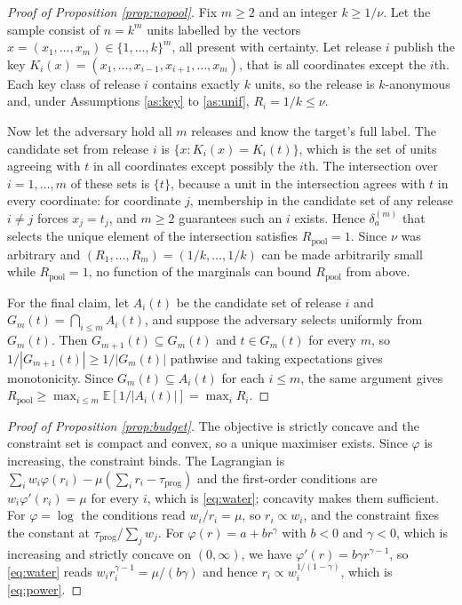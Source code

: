 \documentclass[11pt,a4paper]{article}
\theoremstyle{plain}
\theoremstyle{definition}
\theoremstyle{definition}
\theoremstyle{plain}
\newcommand{\E}{\mathbb{E}}
\begin{document}
\begin{proof}[Proof of Proposition \ref{prop:nopool}]
Fix $m \geq 2$ and an integer $k \geq 1/\nu$. Let the sample consist of
$n = k^m$ units labelled by the vectors $x = (x_1, \dots, x_m) \in \{1, \dots,
k\}^m$, all present with certainty. Let release $i$ publish the key
$K_i(x) = (x_1, \dots, x_{i-1}, x_{i+1}, \dots, x_m)$, that is all coordinates
except the $i$th. Each key class of release $i$ contains exactly $k$ units, so
the release is $k$-anonymous and, under Assumptions \ref{as:key} to
\ref{as:unif}, $R_i = 1/k \leq \nu$.

Now let the adversary hold all $m$ releases and know the target's full label.
The candidate set from release $i$ is $\{x : K_i(x) = K_i(t)\}$, which is the
set of units agreeing with $t$ in all coordinates except possibly the $i$th.
The intersection over $i = 1, \dots, m$ of these sets is $\{t\}$, because a
unit in the intersection agrees with $t$ in every coordinate: for coordinate
$j$, membership in the candidate set of any release $i \neq j$ forces
$x_j = t_j$, and $m \geq 2$ guarantees such an $i$ exists. Hence
$\delta_a^{(m)}$ that selects the unique element of the intersection satisfies
$R_{\mathrm{pool}} = 1$. Since $\nu$ was arbitrary and
$(R_1, \dots, R_m) = (1/k, \dots, 1/k)$ can be made arbitrarily small while
$R_{\mathrm{pool}} = 1$, no function of the marginals can bound
$R_{\mathrm{pool}}$ from above.

For the final claim, let $A_i(t)$ be the candidate set of release $i$ and
$G_m(t) = \bigcap_{i \leq m} A_i(t)$, and suppose the adversary selects
uniformly from $G_m(t)$. Then $G_{m+1}(t) \subseteq G_m(t)$ and $t \in G_m(t)$
for every $m$, so $1/|G_{m+1}(t)| \geq 1/|G_m(t)|$ pathwise and taking
expectations gives monotonicity. Since $G_m(t) \subseteq A_i(t)$ for each
$i \leq m$, the same argument gives $R_{\mathrm{pool}} \geq \max_{i \leq m}
\E[1/|A_i(t)|] = \max_i R_i$.
\end{proof}

\begin{proof}[Proof of Proposition \ref{prop:budget}]
The objective is strictly concave and the constraint set is compact and convex,
so a unique maximiser exists. Since $\varphi$ is increasing, the constraint
binds. The Lagrangian is $\sum_i w_i\varphi(r_i) - \mu(\sum_i r_i -
\tau_{\mathrm{prog}})$ and the first-order conditions are $w_i\varphi'(r_i) =
\mu$ for every $i$, which is \eqref{eq:water}; concavity makes them sufficient.
For $\varphi = \log$ the conditions read $w_i / r_i = \mu$, so $r_i \propto
w_i$, and the constraint fixes the constant at $\tau_{\mathrm{prog}}/\sum_j
w_j$. For $\varphi(r) = a + b r^{\gamma}$ with $b < 0$ and $\gamma < 0$, which
is increasing and strictly concave on $(0,\infty)$, we have $\varphi'(r) = b
\gamma r^{\gamma - 1}$, so \eqref{eq:water} reads $w_i r_i^{\gamma - 1} =
\mu / (b\gamma)$ and hence $r_i \propto w_i^{1/(1-\gamma)}$, which is
\eqref{eq:power}.
\end{proof}
\end{document}

